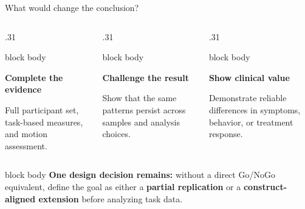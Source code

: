 \documentclass[aspectratio=169,10pt]{beamer}
\begin{document}
\begin{frame}{What would change the conclusion?}
\begin{columns}[T,onlytextwidth]
  \begin{column}{.31\textwidth}
    \begin{beamercolorbox}[rounded=true,sep=.32cm]{block body}
      \centering{\color{Blue}\Large\faDatabase}\par\vspace{.14cm}
      {\color{Navy}\large\bfseries Complete the evidence}\par\vspace{.14cm}
      \small Full participant set, task-based measures, and motion assessment.
    \end{beamercolorbox}
  \end{column}
  \begin{column}{.31\textwidth}
    \begin{beamercolorbox}[rounded=true,sep=.32cm]{block body}
      \centering{\color{Amber}\Large\faVials}\par\vspace{.14cm}
      {\color{Navy}\large\bfseries Challenge the result}\par\vspace{.14cm}
      \small Show that the same patterns persist across samples and analysis choices.
    \end{beamercolorbox}
  \end{column}
  \begin{column}{.31\textwidth}
    \begin{beamercolorbox}[rounded=true,sep=.32cm]{block body}
      \centering{\color{Teal}\Large\faHeartbeat}\par\vspace{.14cm}
      {\color{Navy}\large\bfseries Show clinical value}\par\vspace{.14cm}
      \small Demonstrate reliable differences in symptoms, behavior, or treatment response.
    \end{beamercolorbox}
  \end{column}
\end{columns}

\vspace{.48cm}
\begin{beamercolorbox}[rounded=true,sep=.30cm]{block body}
  {\color{Amber}\bfseries One design decision remains:}\quad
  \small without a direct Go/NoGo equivalent, define the goal as either a \textbf{partial replication} or a \textbf{construct-aligned extension} before analyzing task data.
\end{beamercolorbox}

\vspace{.45cm}
\end{frame}
\end{document}
